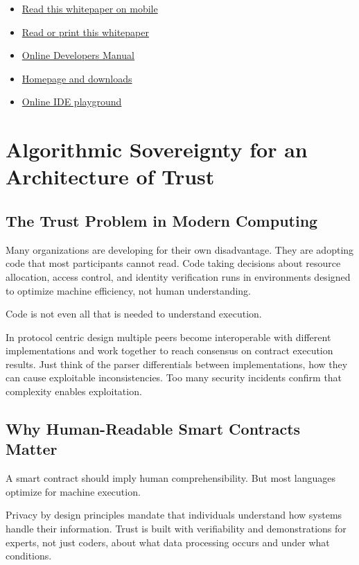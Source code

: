 \begin{itemize}
  \item \href{https://files.dyne.org/zenroom/Zenroom-WhitepaperV5\_mobile.pdf}{Read this whitepaper on mobile}
  \item \href{https://files.dyne.org/zenroom/Zenroom-WhitepaperV5\_desktop.pdf}{Read or print this whitepaper}
  \item \href{https://dev.zenroom.org}{Online Developers Manual}
  \item \href{https://zenroom.org}{Homepage and downloads}
  \item \href{https://apiroom.net}{Online IDE playground}
\end{itemize}

\section{Algorithmic Sovereignty for an Architecture of Trust}

\subsection{The Trust Problem in Modern Computing}

Many organizations are developing for their own disadvantage. They are
adopting code that most participants cannot read. Code taking
decisions about resource allocation, access control, and identity
verification runs in environments designed to optimize machine
efficiency, not human understanding.

Code is not even all that is needed to understand execution.

In protocol centric design multiple peers become interoperable with
different implementations and work together to reach consensus on
contract execution results. Just think of the parser differentials
between implementations, how they can cause exploitable
inconsistencies. Too many security incidents confirm that
complexity enables exploitation.

\subsection{Why Human-Readable Smart Contracts Matter}

A smart contract should imply human comprehensibility. But most
languages optimize for machine execution.

Privacy by design principles mandate that individuals understand how
systems handle their information. Trust is built with verifiability
and demonstrations for experts, not just coders, about what data
processing occurs and under what conditions.

